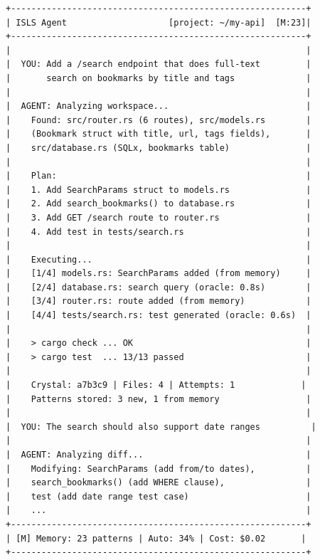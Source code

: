 \documentclass[11pt,a4paper,twoside]{article}
\theoremstyle{definition}
\theoremstyle{remark}
\begin{document}
\begin{lstlisting}[title={The Studio Agent Interface}]
+----------------------------------------------------------+
| ISLS Agent                    [project: ~/my-api]  [M:23]|
+----------------------------------------------------------+
|                                                          |
|  YOU: Add a /search endpoint that does full-text         |
|       search on bookmarks by title and tags              |
|                                                          |
|  AGENT: Analyzing workspace...                           |
|    Found: src/router.rs (6 routes), src/models.rs        |
|    (Bookmark struct with title, url, tags fields),       |
|    src/database.rs (SQLx, bookmarks table)               |
|                                                          |
|    Plan:                                                 |
|    1. Add SearchParams struct to models.rs               |
|    2. Add search_bookmarks() to database.rs              |
|    3. Add GET /search route to router.rs                 |
|    4. Add test in tests/search.rs                        |
|                                                          |
|    Executing...                                          |
|    [1/4] models.rs: SearchParams added (from memory)     |
|    [2/4] database.rs: search query (oracle: 0.8s)        |
|    [3/4] router.rs: route added (from memory)            |
|    [4/4] tests/search.rs: test generated (oracle: 0.6s)  |
|                                                          |
|    > cargo check ... OK                                  |
|    > cargo test  ... 13/13 passed                        |
|                                                          |
|    Crystal: a7b3c9 | Files: 4 | Attempts: 1             |
|    Patterns stored: 3 new, 1 from memory                 |
|                                                          |
|  YOU: The search should also support date ranges          |
|                                                          |
|  AGENT: Analyzing diff...                                |
|    Modifying: SearchParams (add from/to dates),          |
|    search_bookmarks() (add WHERE clause),                |
|    test (add date range test case)                       |
|    ...                                                   |
+----------------------------------------------------------+
| [M] Memory: 23 patterns | Auto: 34% | Cost: $0.02       |
+----------------------------------------------------------+
\end{lstlisting}
\end{document}
